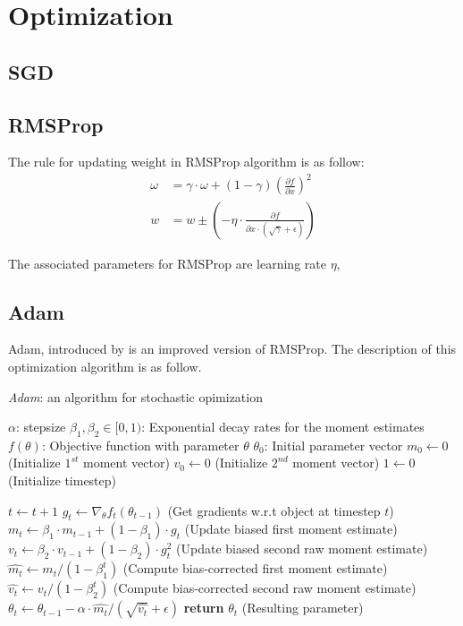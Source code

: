 \section{Optimization}
	\subsection{SGD}
	
	\subsection{RMSProp}

		The rule for updating weight in RMSProp algorithm is as follow:
		\begin{align}
			\omega &= \gamma \cdot \omega + \left( 1 - \gamma \right) \left( \frac{\partial f}{\partial x} \right)^2 \\
			w & = w \pm \left(-\eta \cdot \frac{\partial{f}}{\partial{x} \cdot \left( \sqrt{\gamma} + \epsilon \right) } \right)
		\end{align}

		The associated parameters for RMSProp are learning rate $\eta$, 

	\subsection{Adam}
	Adam, introduced by \cite{DBLP:journals/corr/KingmaB14} is an improved version of RMSProp. The description of this optimization algorithm is as follow.

	\begin{algorithm}
		\caption{\textit{Adam}: an algorithm for stochastic opimization}
		\label{algo:adam}
		\begin{algorithmic}[1]
			\Require $\alpha$: stepsize
			\Require $\beta_1, \beta_2 \in [0, 1)$: Exponential decay rates for the moment estimates
			\Require $f\left( \theta \right)$: Objective function with parameter $\theta$
			\Require $\theta_0$: Initial parameter vector
			\State $m_0 \gets 0$ (Initialize $1^{st}$ moment vector)
			\State $v_0 \gets 0$ (Initialize $2^{nd}$ moment vector)
			\State $1 \gets 0$ (Initialize timestep)

				\State $t \gets t + 1$ 
				\State $g_t \gets \nabla_\theta f_t\left( \theta_{t-1} \right)$ (Get gradients w.r.t object at timestep $t$)
				\State $m_t \gets \beta_1 \cdot m_{t-1} + \left( 1 - \beta_1 \right) \cdot g_t$ (Update biased first moment estimate)
				\State $v_t \gets \beta_2 \cdot v_{t-1} + \left( 1 - \beta_2 \right) \cdot g_t^2$ (Update biased second raw moment estimate)
				\State $\hat{m_t} \gets m_t / \left( 1 - \beta_1^t \right)$ (Compute bias-corrected first moment estimate)
				\State $\hat{v_t} \gets v_t / \left( 1 - \beta_2^t \right)$ (Compute bias-corrected second raw moment estimate)
				\State $\theta_t \gets \theta_{t-1} - \alpha \cdot \hat{m_t} / \left(\sqrt{\hat{v_t}} + \epsilon\right)$
			\EndWhile
			\State \textbf{return} $\theta_t$ (Resulting parameter)
		\end{algorithmic}
	\end{algorithm}
	
